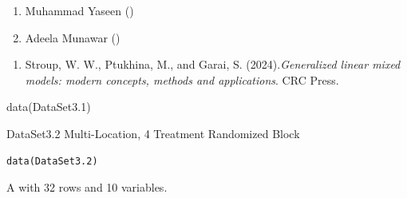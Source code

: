 \documentclass[a4paper]{book}
\begin{document}
%
\begin{Author}
\begin{enumerate}

\item{}  Muhammad Yaseen ()
\item{} Adeela Munawar ()

\end{enumerate}

\end{Author}
%
\begin{References}
\begin{enumerate}

\item{} Stroup, W. W., Ptukhina, M., and Garai, S. (2024).\emph{Generalized linear mixed models: modern concepts, methods and applications}.
CRC Press.

\end{enumerate}

\end{References}
%
\begin{SeeAlso}
\end{SeeAlso}
%
\begin{Examples}
\begin{ExampleCode}
data(DataSet3.1)
\end{ExampleCode}
\end{Examples}
%
\begin{Description}
DataSet3.2 Multi-Location, 4 Treatment Randomized Block
\end{Description}
%
\begin{Usage}
\begin{verbatim}
data(DataSet3.2)
\end{verbatim}
\end{Usage}
%
\begin{Format}
A  with 32 rows and 10 variables.
\end{Format}
%
\end{document}
